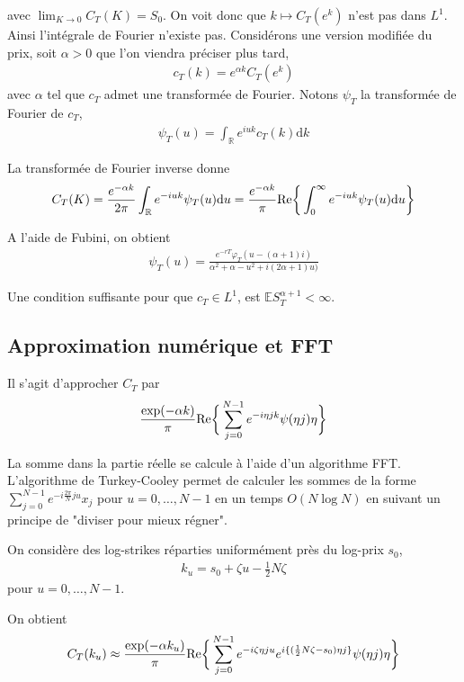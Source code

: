 \documentclass{article}
\begin{document}
avec $\lim_{K\to 0} C_T(K)= S_0$. On voit donc que $k \mapsto C_T(e^k)$ n'est pas dans $L^1$. Ainsi l'intégrale de Fourier n'existe pas. Considérons une version modifiée du prix, soit $\alpha >0$ que l'on viendra préciser plus tard,  
\begin{align*}
	c_T(k) = e^{\alpha k}C_T(e^k)
\end{align*}
avec $\alpha$ tel que $c_T$ admet une transformée de Fourier. Notons $\psi_T$ la transformée de Fourier de $c_T$, 
\begin{align*}
	\psi_T(u) = \int_{\mathbb{R}}e^{iuk}c_T(k)\mathrm{d}k
\end{align*}

La transformée de Fourier inverse donne
\begin{align*}
	C_T(K) = \frac{e^{-\alpha k}}{2\pi}\int_{\mathbb{R}}e^{-i u k} \psi_T(u)\mathrm{d}u = \frac{e^{-\alpha k}}{\pi}\textup{Re}\bigg\{\int_{0}^{\infty}e^{-i u k}\psi_T(u)\mathrm{d}u\bigg\}
\end{align*}

A l'aide de Fubini, on obtient
\begin{align*}
\psi_T(u) = \frac{e^{-rT}\varphi_T(u-(\alpha+1)i)}{\alpha^2+\alpha-u^2+i(2\alpha+1)u)}
\end{align*}

Une condition suffisante pour que $c_T \in L^1$, est $\mathbb{E}S_T^{\alpha+1} < \infty$.
\subsection{Approximation numérique et FFT}
Il s'agit d'approcher $C_T$ par 
\begin{align*}
	\frac{\exp(-\alpha k)}{\pi}\textup{Re}\bigg\{\sum_{j=0}^{N-1} e^{-i \eta j k}\psi(\eta j)\eta\bigg\}
\end{align*}

La somme dans la partie réelle se calcule à l'aide d'un algorithme FFT. L'algorithme de Turkey-Cooley permet de calculer les sommes de la forme $\sum_{j=0}^{N-1} e^{-i\frac{2\pi}{N} j u} x_j$ pour $u=0,\ldots, N-1$ en un temps $O(N\log N)$ en suivant un principe de "diviser pour mieux régner".

On considère des log-strikes réparties uniformément près du log-prix $s_0$, 
\begin{align*}
	k_u = s_0 + \zeta u - \frac{1}{2}N\zeta
\end{align*}
pour $u = 0, \ldots, N-1$.

On obtient
\begin{align*}
	C_T(k_u) \approx \frac{\exp(-\alpha k_u)}{\pi} \textup{Re}\bigg\{\sum_{j=0}^{N-1}e^{-i\zeta \eta j u} e^{i\{(\frac{1}{2}N\zeta-s_0)\eta j\}}\psi(\eta j)\eta\bigg\}
\end{align*}
\end{document}
